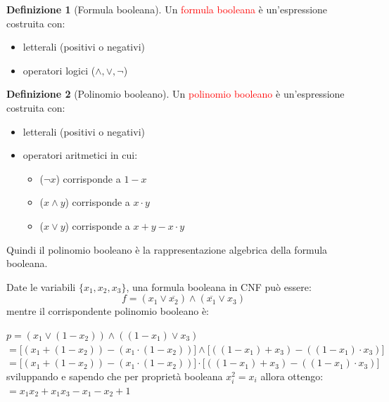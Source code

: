 \documentclass{article}  %
\theoremstyle{definition}
\newtheorem{definition}{Definizione}[section]
\begin{document}
\begin{definition}[Formula booleana]
	Un \textcolor{red}{formula booleana} è un'espressione costruita con:
	\begin{itemize}
		\item letterali (positivi o negativi)
		\item operatori logici ($\land, \lor, \lnot$)
	\end{itemize}
\end{definition}
\begin{definition}[Polinomio booleano]
	Un \textcolor{red}{polinomio booleano} è un'espressione costruita con:
	\begin{itemize}
		\item letterali (positivi o negativi)
		\item operatori aritmetici in cui:
		      \begin{itemize}
			      \item ($\lnot x$) corrisponde a $1-x$
			      \item ($x \land y$) corrisponde a $x \cdot y$
			      \item ($x \lor y$) corrisponde a $x + y - x \cdot y$
		      \end{itemize}
	\end{itemize}
	Quindi il polinomio booleano è la rappresentazione algebrica della formula booleana.
\end{definition}
\begin{esercizio}[Esempio]
	\footnotesize
	Date le variabili $\{x_1,x_2,x_3\}$, una formula booleana in CNF può essere:
	\[
		f = (x_1 \lor \overline{x_2}) \land (\overline{x_1} \lor x_3)
	\]
	mentre il corrispondente polinomio booleano è:
	\begin{center}
		$p = (x_1 \lor (1-x_2)) \land ((1-x_1) \lor x_3)$ \\
		$= \big[(x_1+(1-x_2))-(x_1 \cdot (1-x_2))\big] \land \big[((1-x_1)+x_3) - ((1-x_1)\cdot x_3)\big]$ \\
		$= \big[(x_1+(1-x_2))-(x_1 \cdot (1-x_2))\big] \cdot \big[((1-x_1)+x_3) - ((1-x_1)\cdot x_3)\big]$ \\
		sviluppando e sapendo che per proprietà booleana $x_i^2=x_i$ allora ottengo: \\
		$= x_1x_2+x_1x_3-x_1-x_2+1$
	\end{center}

\end{esercizio}
\end{document}
